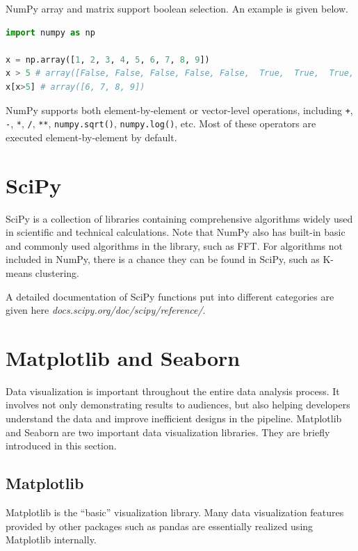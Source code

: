 NumPy array and matrix support boolean selection. An example is given below.
\begin{lstlisting}[language=Python]
import numpy as np

x = np.array([1, 2, 3, 4, 5, 6, 7, 8, 9])
x > 5 # array([False, False, False, False, False,  True,  True,  True,  True])
x[x>5] # array([6, 7, 8, 9])
\end{lstlisting}

NumPy supports both element-by-element or vector-level operations, including \verb|+|, \verb|-|, \verb|*|, \verb|/|, \verb|**|, \verb|numpy.sqrt()|, \verb|numpy.log()|, etc. Most of these operators are executed element-by-element by default.

\section{SciPy}

SciPy is a collection of libraries containing comprehensive algorithms widely used in scientific and technical calculations. Note that NumPy also has built-in basic and commonly used algorithms in the library, such as FFT. For algorithms not included in NumPy, there is a chance they can be found in SciPy, such as K-means clustering.

A detailed documentation of SciPy functions put into different categories are given here \textit{docs.scipy.org/doc/scipy/reference/}.

\section{Matplotlib and Seaborn}

Data visualization is important throughout the entire data analysis process. It involves not only demonstrating results to audiences, but also helping developers understand the data and improve inefficient designs in the pipeline. Matplotlib and Seaborn are two important data visualization libraries. They are briefly introduced in this section.

\subsection{Matplotlib}

Matplotlib is the ``basic'' visualization library. Many data visualization features provided by other packages such as pandas are essentially realized using Matplotlib internally.

